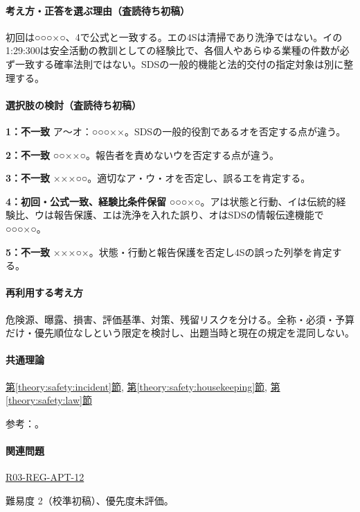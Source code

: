 \paragraph{考え方・正答を選ぶ理由（査読待ち初稿）} 初回は○○○×○、4で公式と一致する。エの4Sは清掃であり洗浄ではない。イの1:29:300は安全活動の教訓としての経験比で、各個人やあらゆる業種の件数が必ず一致する確率法則ではない。SDSの一般的機能と法的交付の指定対象は別に整理する。

\paragraph{選択肢の検討（査読待ち初稿）}\mbox{}\par

\noindent\textbf{1：不一致} ア〜オ：○○○××。SDSの一般的役割であるオを否定する点が違う。\par

\noindent\textbf{2：不一致} ○○××○。報告者を責めないウを否定する点が違う。\par

\noindent\textbf{3：不一致} ×××○○。適切なア・ウ・オを否定し、誤るエを肯定する。\par

\noindent\textbf{4：初回・公式一致、経験比条件保留} ○○○×○。アは状態と行動、イは伝統的経験比、ウは報告保護、エは洗浄を入れた誤り、オはSDSの情報伝達機能で○○○×○。\par

\noindent\textbf{5：不一致} ×××○×。状態・行動と報告保護を否定し4Sの誤った列挙を肯定する。\par

\paragraph{再利用する考え方} 危険源、曝露、損害、評価基準、対策、残留リスクを分ける。全称・必須・予算だけ・優先順位なしという限定を検討し、出題当時と現在の規定を混同しない。

\paragraph{共通理論} \hyperref[theory:safety:incident]{第\ref*{theory:safety:incident}節}, \hyperref[theory:safety:housekeeping]{第\ref*{theory:safety:housekeeping}節}, \hyperref[theory:safety:law]{第\ref*{theory:safety:law}節}

\par 参考：\cite{saf_welfare,saf_4s,saf_chemqa}。

\paragraph{関連問題} \hyperref[q:r03-reg-apt-12]{R03-REG-APT-12}

\par 難易度 2（校準初稿）、優先度未評価。
